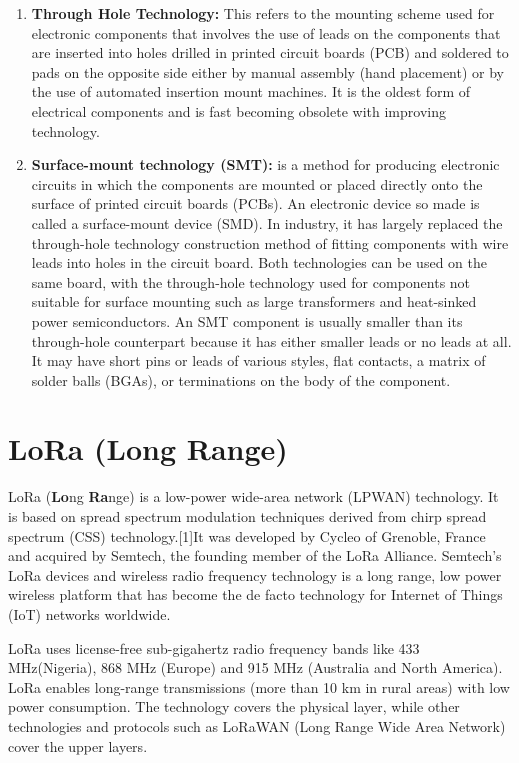 \begin{enumerate}
\item \textbf{Through Hole Technology:} This refers to the mounting scheme used for electronic components that involves the use of leads on the components that are inserted into holes drilled in printed circuit boards (PCB) and soldered to pads on the opposite side either by manual assembly (hand placement) or by the use of automated insertion mount machines. It is the oldest form of electrical components and is fast becoming obsolete with improving technology.
\item \textbf{Surface-mount technology (SMT):} is a method for producing electronic circuits in which the components are mounted or placed directly onto the surface of printed circuit boards (PCBs). An electronic device so made is called a surface-mount device (SMD). In industry, it has largely replaced the through-hole technology construction method of fitting components with wire leads into holes in the circuit board. Both technologies can be used on the same board, with the through-hole technology used for components not suitable for surface mounting such as large transformers and heat-sinked power semiconductors. An SMT component is usually smaller than its through-hole counterpart because it has either smaller leads or no leads at all. It may have short pins or leads of various styles, flat contacts, a matrix of solder balls (BGAs), or terminations on the body of the component. 
\end{enumerate}


\section{LoRa (Long Range)}
LoRa (\textbf{Lo}ng \textbf{Ra}nge) is a low-power wide-area network (LPWAN) technology. It is based on spread spectrum modulation techniques derived from chirp spread spectrum (CSS) technology.[1]It was developed by Cycleo of Grenoble, France and acquired by Semtech, the founding member of the LoRa Alliance.
Semtech’s LoRa devices and wireless radio frequency technology is a long range, low power wireless platform that has become the de facto technology for Internet of Things (IoT) networks worldwide.

LoRa uses license-free sub-gigahertz radio frequency bands like 433 MHz(Nigeria), 868 MHz (Europe) and 915 MHz (Australia and North America). LoRa enables long-range transmissions (more than 10 km in rural areas) with low power consumption. The technology covers the physical layer, while other technologies and protocols such as LoRaWAN (Long Range Wide Area Network) cover the upper layers. 

